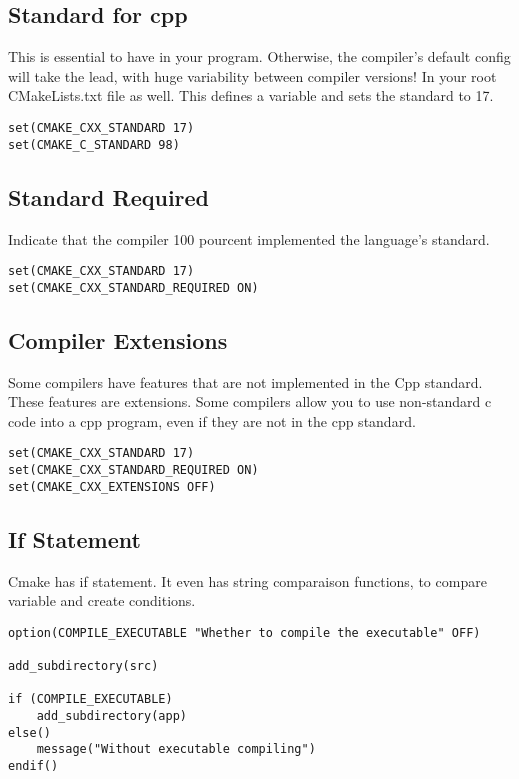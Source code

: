 \documentclass[openany]{report}
\begin{document}
\subsection{Standard for cpp}

This is essential to have in your program. Otherwise, the compiler's default config will take the lead, with huge
variability between compiler versions!
In your root CMakeLists.txt file as well. This defines a variable and sets the standard to 17.

\begin{verbatim}
set(CMAKE_CXX_STANDARD 17)
set(CMAKE_C_STANDARD 98)
\end{verbatim}

\subsection{Standard Required}

Indicate that the compiler 100 pourcent implemented the language's standard.

\begin{verbatim}
set(CMAKE_CXX_STANDARD 17)
set(CMAKE_CXX_STANDARD_REQUIRED ON)
\end{verbatim}

\subsection{Compiler Extensions}

Some compilers have features that are not implemented in the Cpp standard. These features are extensions.
Some compilers allow you to use non-standard c code into a cpp program, even if they are not in the cpp standard.

\begin{verbatim}
set(CMAKE_CXX_STANDARD 17)
set(CMAKE_CXX_STANDARD_REQUIRED ON)
set(CMAKE_CXX_EXTENSIONS OFF)
\end{verbatim}

\subsection{If Statement}

Cmake has if statement. It even has string comparaison functions, to compare variable and create conditions.

\begin{verbatim}
option(COMPILE_EXECUTABLE "Whether to compile the executable" OFF)

add_subdirectory(src)

if (COMPILE_EXECUTABLE)
    add_subdirectory(app)
else()
    message("Without executable compiling")
endif()



\end{verbatim}
\end{document}

